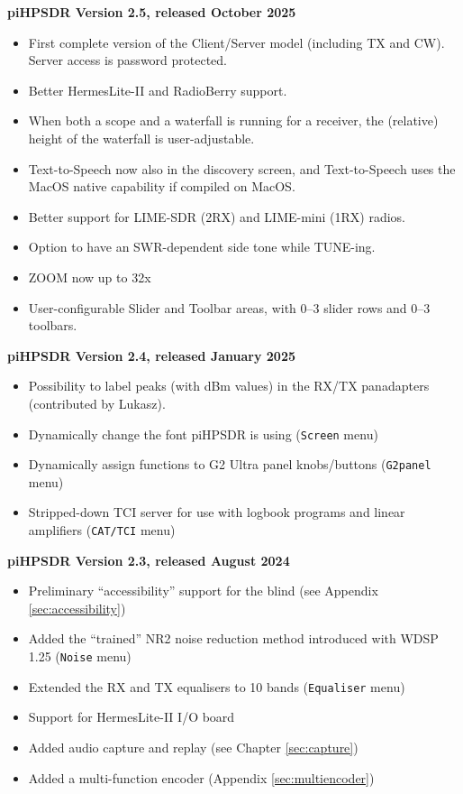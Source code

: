 \documentclass[12pt]{book}
\def\bltt#1{\texttt{\color{blue}#1}}
\def\pH{pi\-HPSDR\xspace}
\begin{document}
\medskip
\textbf{\pH Version 2.5, released October 2025}
\begin{itemize}
\item{First complete version of the Client/Server model (including TX and CW).
Server access is password protected.}
\item{Better HermesLite-II and RadioBerry support.}
\item{When both a scope and a waterfall is running for a receiver, the (relative) height of
the waterfall is user-adjustable.}
\item{Text-to-Speech now also in the discovery screen, and Text-to-Speech uses the MacOS native
capability if compiled on MacOS.}
\item{Better support for LIME-SDR (2RX) and LIME-mini (1RX) radios.}
\item{Option to have an SWR-dependent side tone while TUNE-ing.}
\item{ZOOM now up to 32x}
\item{User-configurable Slider and Toolbar areas, with 0--3 slider rows and 0--3 toolbars.}
\end{itemize}

\medskip
\textbf{\pH Version 2.4, released January 2025}
\begin{itemize}
\item{Possibility to label peaks (with dBm values) in the RX/TX panadapters (contributed
by Lukasz).}
\item{Dynamically change the font \pH is using (\bltt{Screen} menu)}
\item{Dynamically assign functions to G2 Ultra panel knobs/buttons (\bltt{G2panel} menu)}
\item{Stripped-down TCI server for use with logbook programs and linear amplifiers (\bltt{CAT/TCI} menu)}
\end{itemize}

\clearpage
\textbf{\pH Version 2.3, released August 2024}
\begin{itemize}
\item{Preliminary ``accessibility'' support for the blind (see Appendix \ref{sec:accessibility})}
\item{Added the ``trained'' NR2 noise reduction method introduced with WDSP 1.25 (\bltt{Noise} menu)}
\item{Extended the RX and TX equalisers to 10 bands (\bltt{Equaliser} menu)}
\item{Support for HermesLite-II I/O board}
\item{Added audio capture and replay (see Chapter \ref{sec:capture})}
\item{Added a multi-function encoder (Appendix \ref{sec:multiencoder})}
\end{itemize}
\end{document}
